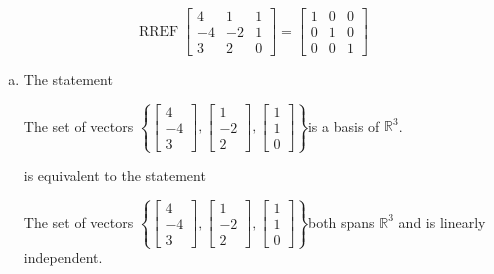 \begin{exerciseAnswer} 


\[\operatorname{RREF} \left[\begin{array}{ccc}
4 & 1 & 1 \\
-4 & -2 & 1 \\
3 & 2 & 0
\end{array}\right] = \left[\begin{array}{ccc}
1 & 0 & 0 \\
0 & 1 & 0 \\
0 & 0 & 1
\end{array}\right] \]


\begin{enumerate}[(a)]
\item The statement 
\begin{center}\begin{minipage}{0.8\textwidth}
 The set of vectors \( \left\{ \left[\begin{array}{c}
4 \\
-4 \\
3
\end{array}\right] , \left[\begin{array}{c}
1 \\
-2 \\
2
\end{array}\right] , \left[\begin{array}{c}
1 \\
1 \\
0
\end{array}\right] \right\} \)is a basis of \(\mathbb{R}^3\). 
\end{minipage}\end{center}
     is equivalent to the statement 
\begin{center}\begin{minipage}{0.8\textwidth}
 The set of vectors \( \left\{ \left[\begin{array}{c}
4 \\
-4 \\
3
\end{array}\right] , \left[\begin{array}{c}
1 \\
-2 \\
2
\end{array}\right] , \left[\begin{array}{c}
1 \\
1 \\
0
\end{array}\right] \right\} \)both spans \(\mathbb{R}^3\) and is linearly independent.
\end{minipage}\end{center}
    

\end{enumerate}
\end{exerciseAnswer}
